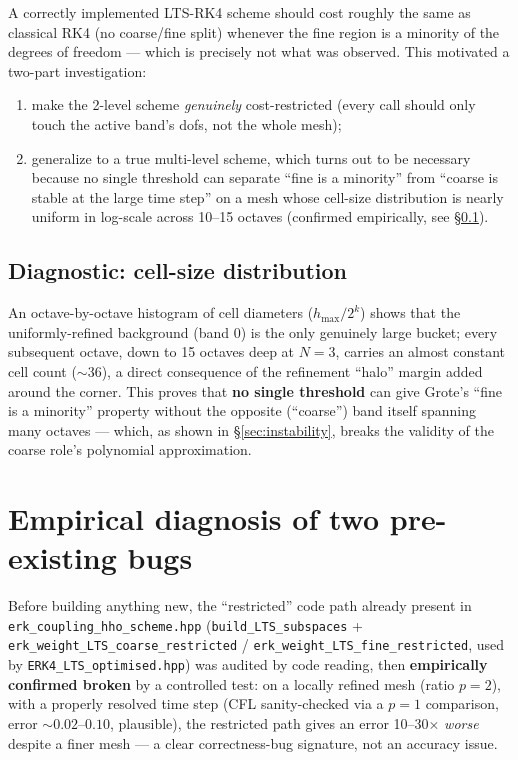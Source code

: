 \documentclass[11pt]{article}
\newcommand{\code}[1]{\texttt{#1}}
\begin{document}
A correctly implemented LTS-RK4 scheme should cost roughly the same as
classical RK4 (no coarse/fine split) whenever the fine region is a
minority of the degrees of freedom --- which is precisely not what was
observed. This motivated a two-part investigation:
\begin{enumerate}
  \item make the 2-level scheme \emph{genuinely} cost-restricted (every
  call should only touch the active band's dofs, not the whole mesh);
  \item generalize to a true multi-level scheme, which turns out to be
  necessary because no single threshold can separate ``fine is a
  minority'' from ``coarse is stable at the large time step'' on a mesh
  whose cell-size distribution is nearly uniform in log-scale across
  10--15 octaves (confirmed empirically, see \S\ref{sec:histogram}).
\end{enumerate}

\subsection{Diagnostic: cell-size distribution}
\label{sec:histogram}

An octave-by-octave histogram of cell diameters ($h_{\max}/2^{k}$) shows
that the uniformly-refined background (band 0) is the only genuinely
large bucket; every subsequent octave, down to 15 octaves deep at $N=3$,
carries an almost constant cell count ($\sim 36$), a direct consequence
of the refinement ``halo'' margin added around the corner. This proves
that \textbf{no single threshold} can give Grote's ``fine is a minority''
property without the opposite (``coarse'') band itself spanning many
octaves --- which, as shown in \S\ref{sec:instability}, breaks the
validity of the coarse role's polynomial approximation.

\section{Empirical diagnosis of two pre-existing bugs}
\label{sec:bugs}

Before building anything new, the ``restricted'' code path already
present in \code{erk\_coupling\_hho\_scheme.hpp}
(\code{build\_LTS\_subspaces} + \code{erk\_weight\_LTS\_coarse\_restricted}
/ \code{erk\_weight\_LTS\_fine\_restricted}, used by
\code{ERK4\_LTS\_optimised.hpp}) was audited by code reading, then
\textbf{empirically confirmed broken} by a controlled test: on a locally
refined mesh (ratio $p=2$), with a properly resolved time step (CFL
sanity-checked via a $p=1$ comparison, error $\sim 0.02$--$0.10$,
plausible), the restricted path gives an error 10--30$\times$
\emph{worse} despite a finer mesh --- a clear correctness-bug signature,
not an accuracy issue.
\end{document}
